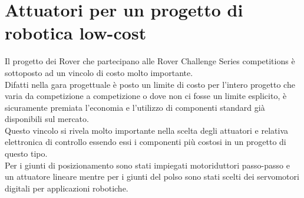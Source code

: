 \documentclass[%
corpo=11pt,
twoside,
 stile=classica,
oldstyle,
greek,%
]{toptesi}
\begin{document}
\chapter{Attuatori per un progetto di robotica low-cost} 
Il progetto dei Rover che partecipano alle Rover Challenge Series competitions è sottoposto ad un vincolo di costo molto importante.\\
 Difatti nella gara progettuale è posto un limite di costo per l'intero progetto che varia da competizione a competizione o dove non ci fosse un limite esplicito, è sicuramente premiata l'economia e l'utilizzo di componenti standard già disponibili sul mercato. \\
Questo vincolo si rivela molto importante nella scelta degli attuatori e relativa elettronica di controllo essendo essi i componenti più costosi in un progetto di questo tipo. \\
Per i giunti di posizionamento sono stati impiegati motoriduttori passo-passo e un attuatore lineare mentre per i giunti del polso sono stati scelti dei servomotori digitali per applicazioni robotiche. 
\end{document}

